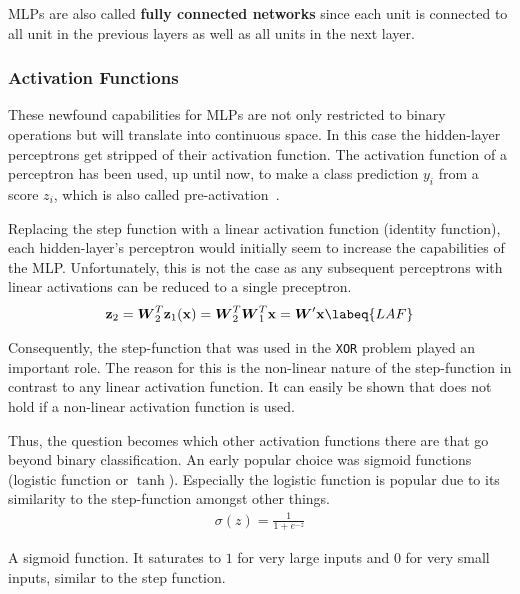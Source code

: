 MLPs are also called \textbf{fully connected networks} since each unit is connected to all unit in the previous layers as well as all units in the next layer.



\subsubsection{Activation Functions}
These newfound capabilities for MLPs are not only restricted to binary operations but will translate into continuous space.
In this case the hidden-layer perceptrons get stripped of their activation function.
The activation function of a perceptron has been used, up until now, to make a class prediction $y_i$ from a score $z_i$, which is also called pre-activation~\cite[p.~6]{grosse}.

Replacing the step function with a linear activation function (\ie identity function), each hidden-layer's perceptron would initially seem to increase the capabilities of the MLP.
Unfortunately, this is not the case as any subsequent perceptrons with linear activations can be reduced to a single preceptron.
\begin{align}
    \vec{z}_2 = \mat{W}^T_2 \vec{z}_1(\vec{x}) = \mat{W}^T_2 \mat{W}^T_1 \vec{x} = \mat{W}' \vec{x}
    \labeq{LAF}
\end{align}

Consequently, the step-function that was used in the \lstinline|XOR| problem played an important role.
The reason for this is the non-linear nature of the step-function in contrast to any linear activation function.
It can easily be shown that  does not hold if a non-linear activation function is used.

Thus, the question becomes which other activation functions there are that go beyond binary classification.
An early popular choice was sigmoid functions (logistic function or $\tanh$).
Especially the logistic function is popular due to its similarity to the step-function amongst other things.
\begin{align}
    \sigma(z) = \frac{1}{1 + e^{-z}}
\end{align}
\begin{marginfigure}
    \resizebox{\textwidth}{!}{
        
    }
    \caption[]{A sigmoid function. It saturates to $1$ for very large inputs and $0$ for very small inputs, similar to the step function.}
\end{marginfigure}

